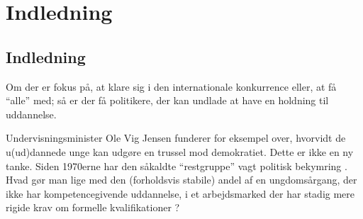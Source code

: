 \renewcommand*{\afterpartskip}{
\vfil
\begin{epigraphs}
\qitem{\itshape
De unge stiller i dag store krav og forventninger om udviklingsmuligheder.
Det er samfundets opgave at reagere imødekommende på disse behov.
Hver enkelt af de unge skal have
reelle muligheder for at opnå de bedst mulige uddannelsesmæssige forudsætninger for et rigt voksenliv.
Det er i hele samfundets interesse at gøre en forstærket indsats.
At efterlade en stor del af en ungdomsgeneration uden de nødvendige kvalifikationer er at lade dem i stikken i en fremtid, der stiller stadig større krav til uddannelse.
En stor gruppe unge uden uddannelse er måske frem for alt et problem for demokratiet.
}
{Undervisningsminister Ole Vig Jensen, Redegørelse til folketinget om uddannelse til alle, 11. november \citeyear{jensenRedegorelseR319931993}}

\qitem{\itshape
Vi skal have uddannelser i verdensklasse. Målet er, at eleverne i folkeskolen bliver blandt verdens bedste til læsning, matematik og naturfag. At mindst 95 pct. af de unge får en ungdomsuddannelse i 2015. Og at mindst 50 pct. af en ungdomsårgang får en videregående uddannelse i 2015.
}
{Statsminister Anders Fogh Rasmussen, tale ved folketingets åbning, 24. februar \citeyear{rasmussenStatsministerAndersFogh2005}}
\end{epigraphs}
}

\part{Indledning}\label{part:intro}

\chapter{Indledning}\label{chap:intro}

 Om der er fokus på, at klare sig i den internationale konkurrence eller, at få “alle” med; så er der få politikere, der kan undlade at have en holdning til uddannelse.

Undervisningsminister Ole Vig Jensen funderer for eksempel over, hvorvidt de u(ud)dannede unge kan udgøre en trussel mod demokratiet.
Dette er ikke en ny tanke. Siden 1970erne har den såkaldte “restgruppe” vagt politisk bekymring \autocite{hansenRestgruppen2004}.
Hvad gør man lige med den (forholdsvis stabile) andel af en ungdomsårgang, der ikke har kompetencegivende uddannelse, i et arbejdsmarked der har stadig mere rigide krav om formelle kvalifikationer \autocite{dpuNyhedsbrevUddannelseKan2001}?

